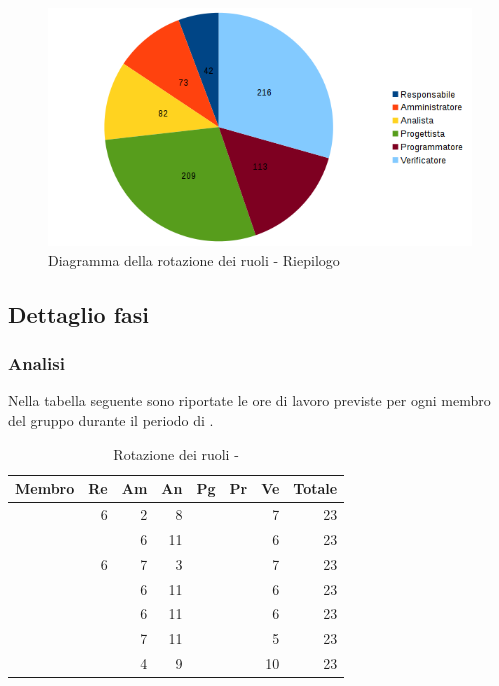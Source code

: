 \documentclass[12pt,a4paper]{article}
\begin{document}
\begin{center}
	\begin{figure}[H]
		\centering \includegraphics[width=\textwidth]{../img/diagrammaTortaRiepilogoTotaleOre.png}
		\caption{Diagramma della rotazione dei ruoli - Riepilogo}
	\end{figure}
\end{center}

\newpage
\subsection{Dettaglio fasi}

\subsubsection{Analisi}

Nella tabella seguente sono riportate le ore di lavoro previste per ogni membro del gruppo durante il periodo di \FA.

\begin{table}[H]
	\begin{center}
		\begin{tabular}{l r r r r r r r}
			\toprule
			\textbf{Membro}	&	\textbf{Re}	&	\textbf{Am}	& \textbf{An} & \textbf{Pg} & \textbf{Pr} & \textbf{Ve} & \textbf{Totale}\\
			\midrule
			\midrule
			\IB{} & 6 & 2 & 8 & & & 7 & 23 \\
			\midrule
			\AB{} & & 6 & 11 & & & 6 & 23 \\
			\midrule
			\NDC{} & 6 & 7 & 3 & & & 7 & 23 \\
			\midrule
			\TP{} & & 6 & 11 & & & 6 & 23 \\
			\midrule
			\WS{} & & 6 & 11 & & & 6 & 23 \\
			\midrule
			\AVE{} & & 7 & 11 & & & 5 & 23 \\
			\midrule
			\AVI{} & & 4 & 9 & & & 10 & 23 \\
			\bottomrule
		\end{tabular}
		\caption{Rotazione dei ruoli - \FA{}}
	\end{center}
\end{table}
\end{document}
